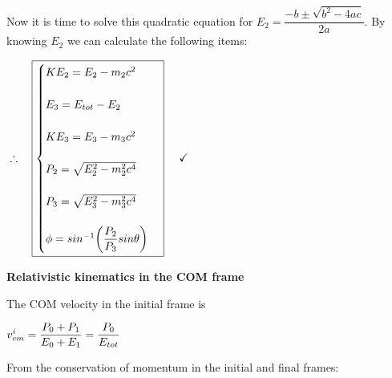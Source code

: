\documentclass[fleqn]{article}
\begin{document}
Now it is time to solve this quadratic equation for $E_2=\dfrac{-b \pm \sqrt{b^2-4ac}}{2a}$. By knowing $E_2$ we can calculate the following items:

$
  \\
  \\
  \therefore ~~~ \boxed{
    \begin{cases}
      KE_2=E_2-m_2 c^2
      \\
      \\
      E_3=E_{tot}-E_2
      \\
      \\
      KE_3=E_3-m_3 c^2
      \\
      \\
      P_2=\sqrt{E^2_2-m^2_2 c^4}
      \\
      \\
      P_3=\sqrt{E^2_3-m^2_3 c^4}
      \\
      \\
      \phi=sin^{-1} \bigg( \dfrac{P_2}{P_3}  sin \theta \bigg)
    \end{cases}
  } ~~~~ \checkmark
  \\
  \\
  \\
  \\
$

\textbf{Relativistic kinematics in the COM frame}

\vspace{10px}

The COM velocity in the initial frame is

$
  \\
  \\
  v^i_{cm}=\dfrac{P_0+P_1}{E_0+E_1}=\dfrac{P_0}{E_{tot}}
  \\
  \\
$

From the conservation of momentum in the initial and final frames:
\end{document}
